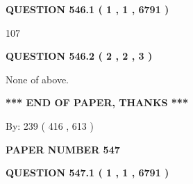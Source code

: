 \documentclass[12pt]{article}
\begin{document}
   
  
\vspace{0.2in}
  
{\textbf{\Large{QUESTION
546.1 
 ( 1 , 1 , 6791 )
}}}
  
  
 
 
\noindent{}

107
 
 
  
\vspace{0.2in}
  
{\textbf{\Large{QUESTION
546.2 
 ( 2 , 2 , 3 )
}}}
  
  
 
 
\noindent{}
 
 
 None of above.
 
 
 
 
   
   
 \vspace{0.2in}
 
   
   
   
   
\vspace{1.0in} 
{\textbf{\large{ *** END OF PAPER, THANKS *** }}} 
   
   
\hspace{1.0in} By: 
 239 ( 416 ,  613 )
   
   
   
   
\newpage 
\setcounter{page}{ 
   547001 } 
   
   
   
   
 {\textbf{ \Large{ PAPER NUMBER  547  }}}
   
   
\vspace{0.2in}
   
   
   
   
   
   
 \vspace{0.2in}
 
 
 
 
   
   
  
\vspace{0.2in}
  
{\textbf{\Large{QUESTION
547.1 
 ( 1 , 1 , 6791 )
}}}
  
  
 
\end{document}
